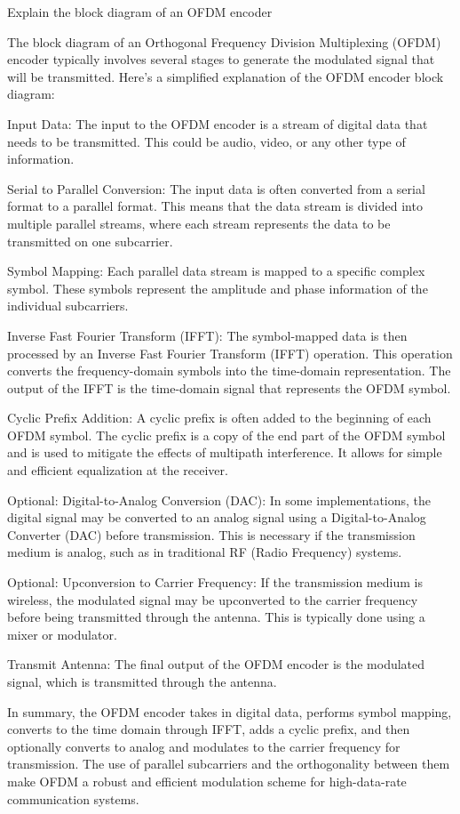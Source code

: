 Explain the block diagram of an OFDM encoder


The block diagram of an Orthogonal Frequency Division Multiplexing (OFDM) encoder typically involves several stages to generate the modulated signal that will be transmitted. Here's a simplified explanation of the OFDM encoder block diagram:

Input Data:
The input to the OFDM encoder is a stream of digital data that needs to be transmitted. This could be audio, video, or any other type of information.

Serial to Parallel Conversion:
The input data is often converted from a serial format to a parallel format. This means that the data stream is divided into multiple parallel streams, where each stream represents the data to be transmitted on one subcarrier.

Symbol Mapping:
Each parallel data stream is mapped to a specific complex symbol. These symbols represent the amplitude and phase information of the individual subcarriers.

Inverse Fast Fourier Transform (IFFT):
The symbol-mapped data is then processed by an Inverse Fast Fourier Transform (IFFT) operation. This operation converts the frequency-domain symbols into the time-domain representation. The output of the IFFT is the time-domain signal that represents the OFDM symbol.

Cyclic Prefix Addition:
A cyclic prefix is often added to the beginning of each OFDM symbol. The cyclic prefix is a copy of the end part of the OFDM symbol and is used to mitigate the effects of multipath interference. It allows for simple and efficient equalization at the receiver.

Optional: Digital-to-Analog Conversion (DAC):
In some implementations, the digital signal may be converted to an analog signal using a Digital-to-Analog Converter (DAC) before transmission. This is necessary if the transmission medium is analog, such as in traditional RF (Radio Frequency) systems.

Optional: Upconversion to Carrier Frequency:
If the transmission medium is wireless, the modulated signal may be upconverted to the carrier frequency before being transmitted through the antenna. This is typically done using a mixer or modulator.

Transmit Antenna:
The final output of the OFDM encoder is the modulated signal, which is transmitted through the antenna.

In summary, the OFDM encoder takes in digital data, performs symbol mapping, converts to the time domain through IFFT, adds a cyclic prefix, and then optionally converts to analog and modulates to the carrier frequency for transmission. The use of parallel subcarriers and the orthogonality between them make OFDM a robust and efficient modulation scheme for high-data-rate communication systems.







